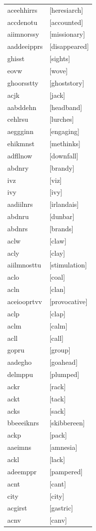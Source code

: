 \documentclass{article}
\begin{document}
\begin{tabular}{ll}
aceehhirrs & [heresiarch] \\
accdenotu & [accounted] \\
aiimnorssy & [missionary] \\
aaddeeipprs & [disappeared] \\
ghisst & [sights] \\
eovw & [wove] \\
ghoorsstty & [ghoststory] \\
acjk & [jack] \\
aabddehn & [headband] \\
cehlrsu & [lurches] \\
aeggginn & [engaging] \\
ehikmnst & [methinks] \\
adfllnow & [downfall] \\
abdnry & [brandy] \\
ivz & [viz] \\
ivy & [ivy] \\
aadiilnrs & [irlandais] \\
abdnru & [dunbar] \\
abdnrs & [brands] \\
aclw & [claw] \\
acly & [clay] \\
aiilmnosttu & [stimulation] \\
aclo & [coal] \\
acln & [clan] \\
aceiooprtvv & [provocative] \\
aclp & [clap] \\
aclm & [calm] \\
acll & [call] \\
gopru & [group] \\
aadegho & [goahead] \\
delmppu & [plumped] \\
ackr & [rack] \\
ackt & [tack] \\
acks & [sack] \\
bbeeeiknrs & [skibbereen] \\
ackp & [pack] \\
aaeimns & [amnesia] \\
ackl & [lack] \\
adeemppr & [pampered] \\
acnt & [cant] \\
city & [city] \\
acgirst & [gastric] \\
acnv & [canv] \\

\end{tabular}
\end{document}
